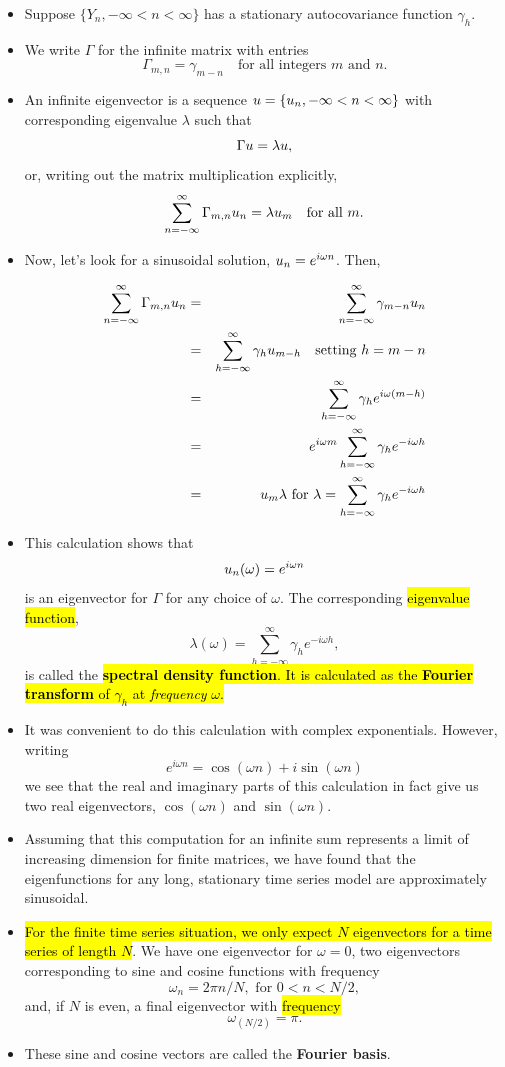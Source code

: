 \documentclass[]{article}
\begin{document}
\begin{itemize}
\item
  Suppose \(\{Y_n,-\infty<n<\infty\}\) has a stationary autocovariance
  function \(\gamma_h\).
\item
  We write \(\Gamma\) for the infinite matrix with entries
  \[ \Gamma_{m,n} = \gamma_{m-n} \quad \mbox{for all integers $m$ and $n$}.\]
\item
  An infinite eigenvector is a sequence
  \(u=\{u_n, -\infty<n<\infty\}\) with corresponding eigenvalue
  \(\lambda\) such that \[\Gamma u = \lambda u,\] or, writing out
  the matrix multiplication explicitly,
  \[\sum_{n=-\infty}^\infty \Gamma_{m,n} u_n = \lambda u_m\quad \mbox{for all $m$}.\]
\item
  Now, let's look for a sinusoidal solution, \(u_n = e^{i\omega n}\).
  Then,

  \begin{eqnarray}
  \sum_{n=-\infty}^\infty \Gamma_{m,n} u_n 
  &=& \sum_{n=-\infty}^\infty \gamma_{m-n} u_n 
  \\
  &=& \sum_{h=-\infty}^\infty \gamma_{h}  u_{m-h} \quad \mbox{setting $h=m-n$}
  \\
  &=& \sum_{h=-\infty}^\infty \gamma_{h}  e^{i\omega(m-h)}
  \\
  &=& e^{i\omega m} \sum_{h=-\infty}^\infty \gamma_{h}  e^{-i\omega h}
  \\
  &=& u_m \lambda \mbox{ for } \lambda= \sum_{h=-\infty}^\infty \gamma_{h}  e^{-i\omega h}
  \end{eqnarray}
\item
  This calculation shows that \[u_n(\omega) = e^{i\omega n}\] is an
  eigenvector for \(\Gamma\) for any choice of \(\omega\). The
  corresponding \hl{eigenvalue function},
  \[\lambda(\omega)= \sum_{h=-\infty}^\infty \gamma_{h}  e^{-i\omega h},\]
  is called the \hl{\textbf{spectral density function}. It is calculated as
  the \textbf{Fourier transform} of $\gamma_h$ at \emph{frequency}
  $\omega$.}
\item
  It was convenient to do this calculation with complex exponentials.
  However, writing
  \[ e^{i\omega n} = \cos(\omega n) + i \sin(\omega n)\] we see that the
  real and imaginary parts of this calculation in fact give us two real
  eigenvectors, \(\cos(\omega n)\) and \(\sin(\omega n)\).
\item
  Assuming that this computation for an infinite sum represents a limit
  of increasing dimension for finite matrices, we have found that the
  eigenfunctions for any long, stationary time series model are
  approximately sinusoidal.
\item
  \hl{For the finite time series situation, we only expect $N$
  eigenvectors for a time series of length $N$}. We have one
  eigenvector for \(\omega=0\), two eigenvectors corresponding to sine
  and cosine functions with frequency
  \[\omega_{n} = 2\pi n/N, \mbox{ for $0<n<N/2$},\] and, if \(N\) is
  even, a final eigenvector with \hl{frequency} \[\omega_{(N/2)} = \pi.\]
\item
  These sine and cosine vectors are called the \textbf{Fourier basis}.
\end{itemize}
\end{document}
